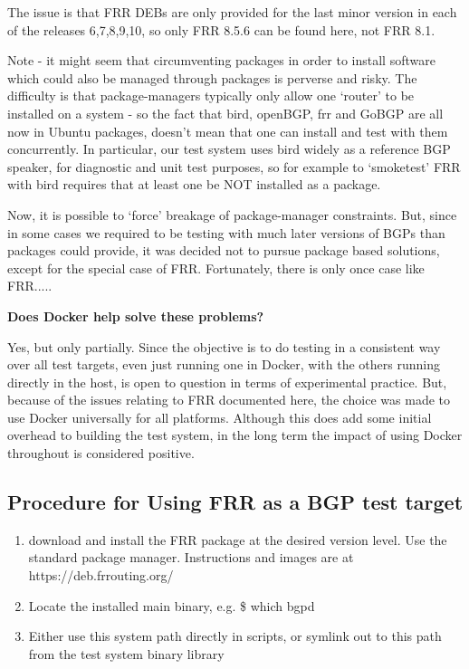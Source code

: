 The issue is that FRR DEBs are only provided for the last minor version in each of the releases 6,7,8,9,10, so only FRR 8.5.6 can be found here, not FRR 8.1.

Note - it might seem that circumventing packages in order to install software which could also be managed through packages is perverse and risky.
The difficulty is that package-managers typically only allow one `router' to be installed on a system - so the fact that bird, openBGP, frr and GoBGP are all now in Ubuntu packages, doesn't mean that one can install and test with them concurrently.
In particular, our test system uses bird widely as a reference BGP speaker, for diagnostic and unit test purposes, so for example to `smoketest' FRR with bird requires that at least one be NOT installed as a package.

Now, it is possible to `force' breakage of package-manager constraints.
But, since in some cases we required to be testing with much later versions of BGPs than packages could provide, it was decided not to pursue package based solutions, except for the special case of FRR.
Fortunately, there is only once case like FRR.....

\textbf{Does Docker help solve these problems?}

Yes, but only partially.
Since the objective is to do testing in a consistent way over all test targets, even just running one in Docker, with the others running directly in the host, is open to question in terms of experimental practice.
But, because of the issues relating to FRR documented here, the choice was made to use Docker universally for all platforms.
Although this does add some initial overhead to building the test system, in the long term the impact of using Docker throughout is considered positive.

\subsection {Procedure for Using FRR as a BGP test target}

\begin{enumerate}
	\item download and install the FRR package at the desired version level.  Use the standard package manager.  Instructions and images are at https://deb.frrouting.org/
	\item Locate the installed main binary, e.g. \$ which bgpd
	\item Either use this system path directly in scripts, or symlink out to this path from the test system binary library
\end{enumerate}

